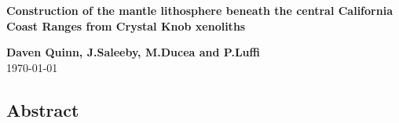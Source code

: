 \documentclass[letterpaper,12pt]{article}
\begin{document}
\begin{spacing}{0.8}\noindent\Gotham\Large\textbf{Construction of the mantle lithosphere beneath
the central California Coast Ranges from Crystal Knob xenoliths}\end{spacing}
{\noindent\GothamLight\normalsize\textbf{Daven Quinn, J.Saleeby, M.Ducea and P.Luffi}}\\
{\noindent\GothamLight\normalsize\today}\\


\begin{spacing}{1.2}

\section*{Abstract}




\end{spacing}




\pagebreak

\setcounter{secnumdepth}{-1}


\end{document}
